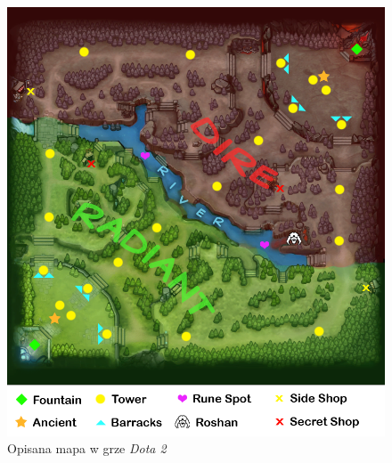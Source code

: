 \documentclass{article}
\begin{document}
\begin{figure}[H]
\includegraphics[width=\textwidth]{dota2_map.png}
\caption[Opisana mapa w grze \textit{Dota 2}]{Opisana mapa w grze \textit{Dota 2} \cite{dota2_map_src}} 
\label{dota2_map}
\end{figure}
\end{document}
